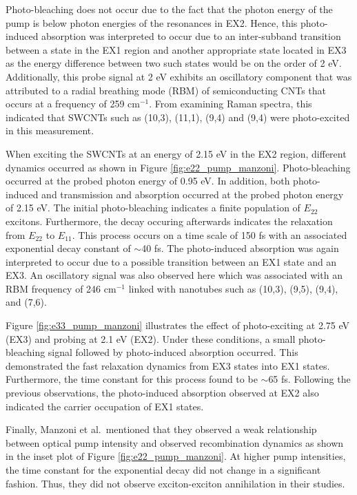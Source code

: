 Photo-bleaching does not occur due to the fact that the photon energy of the pump is below photon energies of the resonances in EX2. Hence, this photo-induced absorption was interpreted to occur due to an inter-subband transition between a state in the EX1 region and another appropriate state located in EX3 as the energy difference between two such states would be on the order of 2 eV. Additionally, this probe signal at 2 eV exhibits an oscillatory component that was attributed to a radial breathing mode (RBM) of semiconducting CNTs that occurs at a frequency of 259 $\text{cm}^{-1}$. From examining Raman spectra, this indicated that SWCNTs such as (10,3), (11,1), (9,4) and (9,4) were photo-excited in this measurement.


When exciting the SWCNTs at an energy of 2.15 eV in the EX2 region, different dynamics occurred as shown in Figure \ref{fig:e22_pump_manzoni}. Photo-bleaching occurred at the probed photon energy of 0.95 eV. In addition, both photo-induced and transmission and absorption occurred at the probed photon energy of 2.15 eV. The initial photo-bleaching indicates a finite population of $E_{22}$ excitons. Furthermore, the decay occuring afterwards indicates the relaxation from $E_{22}$ to $E_{11}$. This process occurs on a time scale of 150 fs with an associated exponential decay constant of $\sim$40 fs. The photo-induced absorption was again interpreted to occur due to a possible transition between an EX1 state and an EX3. An oscillatory signal was also observed here which was associated with an RBM frequency of 246 $\text{cm}^{-1}$ linked with nanotubes such as (10,3), (9,5), (9,4), and (7,6).


Figure \ref{fig:e33_pump_manzoni} illustrates the effect of photo-exciting at 2.75 eV (EX3) and probing at 2.1 eV (EX2). Under these conditions, a small photo-bleaching signal followed by photo-induced absorption occurred. This demonstrated the fast relaxation dynamics from EX3 states into EX1 states. Furthermore, the time constant for this process found to be $\sim$65 fs. Following the previous observations, the photo-induced absorption observed at EX2 also indicated the carrier occupation of EX1 states.

Finally, Manzoni et al.\ mentioned that they observed a weak relationship between optical pump intensity and observed recombination dynamics as shown in the inset plot of Figure \ref{fig:e22_pump_manzoni}. At higher pump intensities, the time constant for the exponential decay did not change in a significant fashion. Thus, they did not observe exciton-exciton annihilation in their studies.

